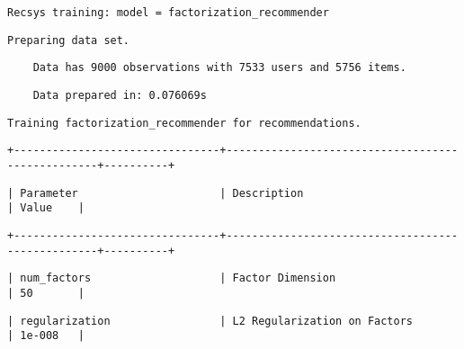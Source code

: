 \documentclass[11pt]{article}
\begin{document}
    
    \begin{verbatim}
Recsys training: model = factorization_recommender
    \end{verbatim}

    
    
    \begin{verbatim}
Preparing data set.
    \end{verbatim}

    
    
    \begin{verbatim}
    Data has 9000 observations with 7533 users and 5756 items.
    \end{verbatim}

    
    
    \begin{verbatim}
    Data prepared in: 0.076069s
    \end{verbatim}

    
    
    \begin{verbatim}
Training factorization_recommender for recommendations.
    \end{verbatim}

    
    
    \begin{verbatim}
+--------------------------------+--------------------------------------------------+----------+
    \end{verbatim}

    
    
    \begin{verbatim}
| Parameter                      | Description                                      | Value    |
    \end{verbatim}

    
    
    \begin{verbatim}
+--------------------------------+--------------------------------------------------+----------+
    \end{verbatim}

    
    
    \begin{verbatim}
| num_factors                    | Factor Dimension                                 | 50       |
    \end{verbatim}

    
    
    \begin{verbatim}
| regularization                 | L2 Regularization on Factors                     | 1e-008   |
    \end{verbatim}
\end{document}
